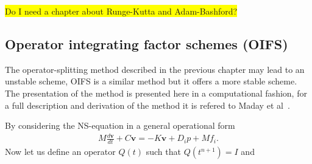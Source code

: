 \colorbox{yellow}{Do I need a chapter about Runge-Kutta and Adam-Bashford?}



\subsection{Operator integrating factor schemes (OIFS)}
The operator-splitting method described in the previous chapter may lead to an unstable scheme,
OIFS is a similar method but it offers a more stable scheme. The presentation of the method 
is presented here in a computational fashion, for a full description and derivation of the method 
it is refered to Maday et al~\cite{raey}.

By considering the NS-equation in a general operational form 
\begin{align}
    M\frac{d \mathbf{v}}{dt} + C\mathbf{v} = -K\mathbf{v} +D_i p +Mf_i.
    \label{eq:NSoperator}
\end{align}
Now let us define an operator $Q(t)$ such that $Q(t^{n+1}) = I$ and 

